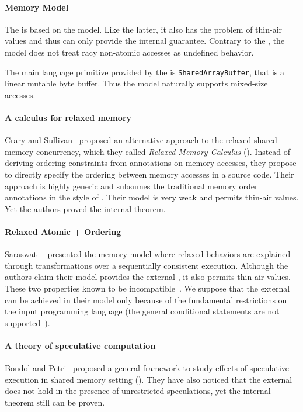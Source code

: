 \paragraph{\JS Memory Model}

The \JSMM is based on the \CMM model. 
Like the latter, it also has the problem of thin-air values
and thus can only provide the internal \DRF guarantee. 
Contrary to the \CMM, the \JS model does not treat 
racy non-atomic accesses as undefined behavior. 

The main language primitive provided by the \JSMM
is \texttt{SharedArrayBuffer}, that is a linear mutable byte buffer.
Thus the model naturally supports mixed-size accesses.

\paragraph{A calculus for relaxed memory}

Crary and Sullivan~\cite{Crary-Sullivan:POPL15} proposed 
an alternative approach to the relaxed shared memory concurrency,
which they called \emph{Relaxed Memory Calculus} (\RMC).
Instead of deriving ordering constraints from annotations 
on memory accesses, they propose to directly specify 
the ordering between memory accesses in a source code. 
Their approach is highly generic and subsumes 
the traditional memory order annotations in the style of \CMM.
Their model is very weak and permits thin-air values. 
Yet the authors proved the internal \DRF theorem.

\paragraph{Relaxed Atomic + Ordering}

Saraswat~\etal~\cite{Saraswat-al:PPoPP07} presented the \RAO memory model
where relaxed behaviors are explained through transformations 
over a sequentially consistent execution.
Although the authors claim their model provides the external \DRF,
it also permits thin-air values. 
These two properties known to be incompatible~\cite{Batty-al:ESOP15}.
We suppose that the external \DRF can be achieved in their model 
only because of the fundamental restrictions on the input programming language 
(\eg the general conditional statements are not supported~\cite{PichonPharabod-Sewell:POPL16}). 

\paragraph{A theory of speculative computation}

Boudol and Petri~\cite{Boudol-Petri:ESOP10} proposed a general 
framework to study effects of speculative execution in
shared memory setting (\TSC). 
They have also noticed that the external \DRF does not 
hold in the presence of unrestricted speculations, 
yet the internal \DRF theorem still can be proven. 
